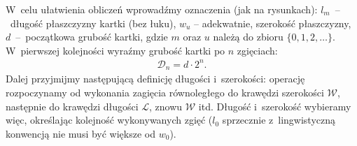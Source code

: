 	W~celu ułatwienia obliczeń wprowadźmy oznaczenia 
	(jak na rysunkach): $l_m$~--~długość płaszczyzny kartki (bez łuku), 
	$w_u$ -- adekwatnie, szerokość płaszczyzny, $d$~--~początkowa grubość kartki, 
	gdzie $m$ oraz $u$ należą do zbioru $ \{0,1,2,\dots\}$.\\
	W~pierwszej kolejności wyraźmy grubość kartki po $n$ zgięciach:
	\begin{gather*}
		\mathcal{D}_n = d\cdot 2^{n}.
	\end{gather*}	
	Dalej przyjmijmy następującą definicję długości i~szerokości: operację rozpoczynamy 
	od wykonania zagięcia równoległego do krawędzi szerokości $\mathcal{W}$,
	następnie do krawędzi długości $\mathcal{L}$, znowu $\mathcal{W}$ itd.
	Długość i~szerokość wybieramy więc, określając kolejność wykonywanych zgięć
	($l_0$ sprzecznie z~lingwistyczną konwencją nie musi być większe od $w_0$).
